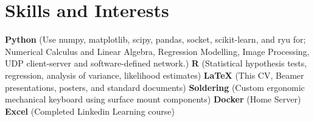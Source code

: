 \documentclass[a4paper,10pt]{letter}
\begin{document}






\section{Skills and Interests}

\textbf{Python} (Use numpy, matplotlib, scipy, pandas, socket, scikit-learn, and ryu for; Numerical Calculus and Linear Algebra, Regression Modelling, Image Processing, UDP client-server and software-defined network.) 
\textbf{R} (Statistical hypothesis tests, regression, analysis of variance, likelihood estimates) 
\textbf{LaTeX} (This CV, Beamer presentations, posters, and standard documents) 
\textbf{Soldering} (Custom ergonomic mechanical keyboard using surface mount components) 
\textbf{Docker} (Home Server)
\textbf{Excel} (Completed Linkedin Learning course)
\end{document}
